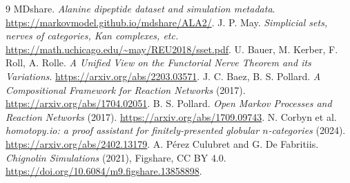 \documentclass[11pt]{article}
\begin{document}
\footnotesize
\begin{thebibliography}{9}\setlength{\itemsep}{1pt}
 MDshare. \emph{Alanine dipeptide dataset and simulation metadata}.
\url{https://markovmodel.github.io/mdshare/ALA2/}.
 J. P. May. \emph{Simplicial sets, nerves of categories, Kan complexes, etc.}
\url{https://math.uchicago.edu/~may/REU2018/sset.pdf}.
 U. Bauer, M. Kerber, F. Roll, A. Rolle.
\emph{A Unified View on the Functorial Nerve Theorem and its Variations}.
\url{https://arxiv.org/abs/2203.03571}.
 J. C. Baez, B. S. Pollard.
\emph{A Compositional Framework for Reaction Networks} (2017).
\url{https://arxiv.org/abs/1704.02051}.
 B. S. Pollard. \emph{Open Markov Processes and Reaction Networks} (2017).
\url{https://arxiv.org/abs/1709.09743}.
 N. Corbyn et al.
\emph{homotopy.io: a proof assistant for finitely-presented globular $n$-categories} (2024).
\url{https://arxiv.org/abs/2402.13179}.
 A. P\'erez Culubret and G. De Fabritiis.
\emph{Chignolin Simulations} (2021), Figshare, CC BY 4.0.
\url{https://doi.org/10.6084/m9.figshare.13858898}.
\end{thebibliography}
\end{document}
